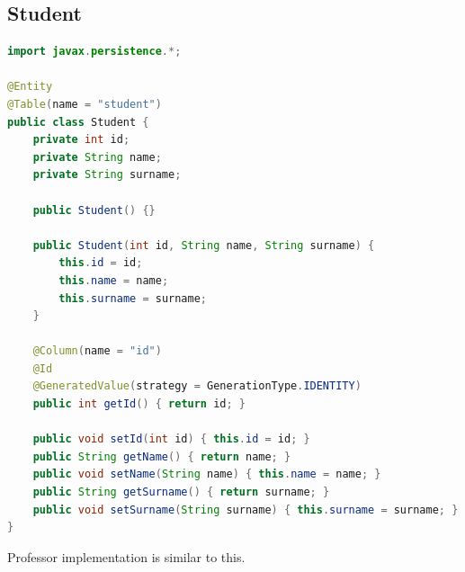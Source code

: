 \documentclass{report}
\begin{document}
\subsection*{Student}
\begin{lstlisting}[language=Java]
import javax.persistence.*;

@Entity
@Table(name = "student")
public class Student {
	private int id;
	private String name;
	private String surname;

	public Student() {}

	public Student(int id, String name, String surname) {
		this.id = id;
		this.name = name;
		this.surname = surname;
	}

	@Column(name = "id")
	@Id
	@GeneratedValue(strategy = GenerationType.IDENTITY)
	public int getId() { return id; }

	public void setId(int id) { this.id = id; }
	public String getName() { return name; }
	public void setName(String name) { this.name = name; }
	public String getSurname() { return surname; }
	public void setSurname(String surname) { this.surname = surname; }
}
\end{lstlisting}
Professor implementation is similar to this.
\end{document}
